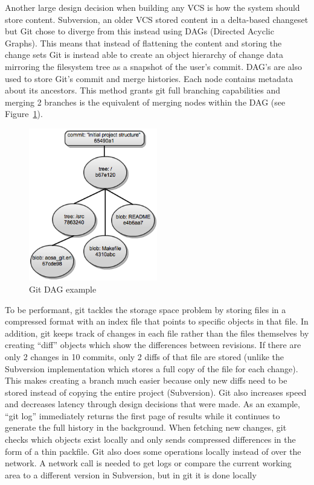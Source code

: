 \documentclass[12pt]{article}
\begin{document}
Another large design decision when building any VCS is how the system should store content. Subversion, an older VCS stored content in a delta-based changeset but Git chose to diverge from this instead using DAGs (Directed Acyclic Graphs). This means that instead of flattening the content and storing the change sets Git is instead able to create an object hierarchy of change data mirroring the filesystem tree as a snapshot of the user’s commit. DAG’s are also used to store Git’s commit and merge histories. Each node contains metadata about its ancestors. This method grants git full branching capabilities and merging 2 branches is the equivalent of merging nodes within the DAG (see Figure~\ref{fig:dag}).

\begin{figure}[htbp]
\centering
\includegraphics[width=0.5\textwidth]{dag.png}
\caption{Git DAG example}
\label{fig:dag}
\end{figure}

To be performant, git tackles the storage space problem by storing files in a compressed format with an index file that points to specific objects in that file. In addition, git keeps track of changes in each file rather than the files themselves by creating ``diff'' objects which show the differences between revisions. If there are only 2 changes in 10 commits, only 2 diffs of that file are stored (unlike the Subversion implementation which stores a full copy of the file for each change). This makes creating a branch much easier because only new diffs need to be stored instead of copying the entire project (Subversion). Git also increases speed and decreases latency through design decisions that were made. As an example, ``git log'' immediately returns the first page of results while it continues to generate the full history in the background. When fetching new changes, git checks which objects exist locally and only sends compressed differences in the form of a thin packfile. Git also does some operations locally instead of over the network. A network call is needed to get logs or compare the current working area to a different version in Subversion, but in git it is done locally
\end{document}
